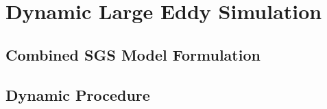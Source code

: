  
\chapter{Dynamic Large Eddy Simulation}
\label{sec:dynLES}

\section{Combined SGS Model Formulation}
\label{sec:combForm}


\section{Dynamic Procedure}
\label{sec:dynProc}


